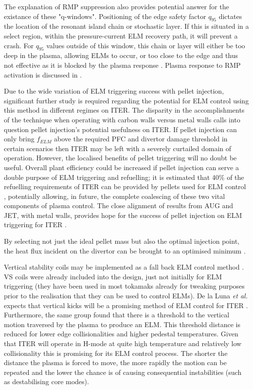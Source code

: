 \documentclass[11pt, twocolumn]{article}  %
\newcommand{\citep}[1]{\cite{#1}}
\begin{document}
The explanation \cite{Snyder2012} of RMP suppression also provides potential answer for the existance of these "q-windows". Positioning of the edge safety factor $q_{95}$ dictates the location of the resonant island chain or stochastic layer. If this is situated in a select region, within the pressure-current ELM recovery path, it will prevent a crash. For $q_{95}$ values outside of this window, this chain or layer will either be too deep in the plasma, allowing ELMs to occur, or too close to the edge and thus not effective as it is blocked by the plasma response \cite{Snyder2012}. Plasma response to RMP activation is discussed in \cite{Waelbroeck2009}.


Due to the wide variation of ELM triggering success with pellet injection, significant further study is required regarding the potential for ELM control using this method in different regimes on ITER. The disparity in the accomplishments of the technique when operating with carbon walls versus metal walls calls into question pellet injection's potential usefulness on ITER. If pellet injection can only bring $f_{ELM}$ above the required PFC and divertor damage threshold in certain scenarios then ITER may be left with a severely curtailed domain of operation. However, the localised benefits of pellet triggering will no doubt be useful. Overall plant efficiency could be increased if pellet injection can serve a double purpose of ELM triggering and refuelling; it is estimated that 40\% of the refuelling requirements of ITER can be provided by pellets used for ELM control \cite{Loarte2014a}, potentially allowing, in future, the complete coalescing of these two vital components of plasma control. The close alignment of results from AUG and JET, with metal walls, provides hope for the success of pellet injection on ELM triggering for ITER \cite{Lang2015}.

By selecting not just the ideal pellet mass but also the optimal injection point, the heat flux incident on the divertor can be brought to an optimised minimum \citep{Baylor2015}.

Vertical stability coils may be implemented as a fall back ELM control method \cite{Loarte2014a}. VS coils were already included into the design, just not initially for ELM triggering (they have been used in most tokamaks already for tweaking purposes prior to the realisation that they can be used to control ELMs). De la Luna \textit{et al.} expects that vertical kicks will be a promising method of ELM control for ITER \cite{DelaLuna2016}. Furthermore, the same group found that there is a threshold to the vertical motion traversed by the plasma to produce an ELM. This threshold distance is reduced for lower edge collisionalities and higher pedestal temperatures. Given that ITER will operate in H-mode at quite high temperature and relatively low collisionality this is promising for its ELM control process. The shorter the distance the plasma is forced to move, the more rapidly the motion can be repeated and the lower the chance is of causing consequential instabilities (such as destabilising core modes).
\end{document}
